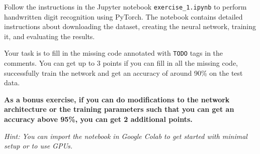 \documentclass[DIN, pagenumber=false, fontsize=11pt, parskip=half]{scrartcl}
\begin{document}
Follow the instructions in the Jupyter notebook \texttt{exercise\_1.ipynb} to perform handwritten digit recognition using PyTorch. The notebook contains detailed instructions about downloading the dataset, creating the neural network, training it, and evaluating the results.

Your task is to fill in the missing code annotated with \texttt{TODO} tags in the comments. You can get up to 3 points if you can fill in all the missing code, successfully train the network and get an accuracy of around 90\% on the test data.

\textbf{As a bonus exercise, if you can do modifications to the network architecture or the training parameters such that you can get an accuracy above 95\%, you can get 2 additional points.}

\textit{Hint: You can import the notebook in Google Colab to get started with minimal setup or to use GPUs.}
\end{document}
